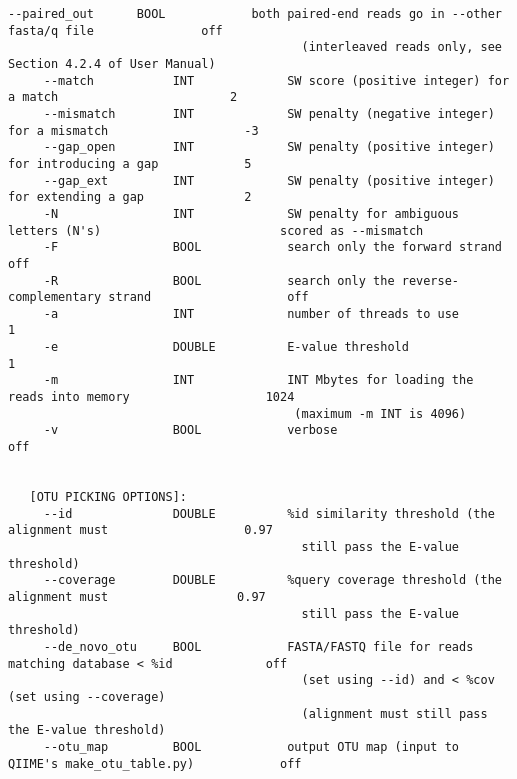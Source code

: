 \documentclass[10pt,a4paper]{article}
\begin{document}
\begin{Verbatim}[fontsize=\footnotesize]
     --paired_out      BOOL            both paired-end reads go in --other fasta/q file               off
                                         (interleaved reads only, see Section 4.2.4 of User Manual)
     --match           INT             SW score (positive integer) for a match                        2
     --mismatch        INT             SW penalty (negative integer) for a mismatch                   -3
     --gap_open        INT             SW penalty (positive integer) for introducing a gap            5
     --gap_ext         INT             SW penalty (positive integer) for extending a gap              2
     -N                INT             SW penalty for ambiguous letters (N's)                         scored as --mismatch
     -F                BOOL            search only the forward strand                                 off
     -R                BOOL            search only the reverse-complementary strand                   off
     -a                INT             number of threads to use                                       1
     -e                DOUBLE          E-value threshold                                              1
     -m                INT             INT Mbytes for loading the reads into memory                   1024
                                        (maximum -m INT is 4096)
     -v                BOOL            verbose                                                        off


   [OTU PICKING OPTIONS]: 
     --id              DOUBLE          %id similarity threshold (the alignment must                   0.97
                                         still pass the E-value threshold)
     --coverage        DOUBLE          %query coverage threshold (the alignment must                  0.97
                                         still pass the E-value threshold)
     --de_novo_otu     BOOL            FASTA/FASTQ file for reads matching database < %id             off
                                         (set using --id) and < %cov (set using --coverage) 
                                         (alignment must still pass the E-value threshold)
     --otu_map         BOOL            output OTU map (input to QIIME's make_otu_table.py)            off



\end{Verbatim}
\end{document}
